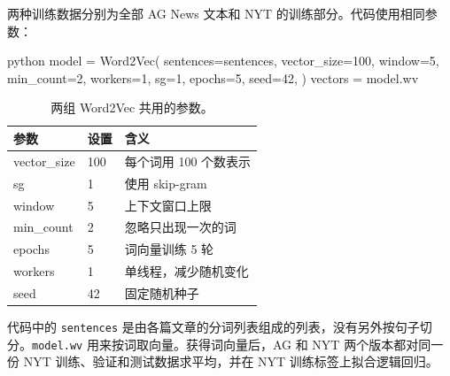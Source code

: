 \documentclass[12pt, a4paper, fontset=fandol]{ctexart}
\begin{document}
两种训练数据分别为全部 AG News 文本和 NYT 的训练部分。代码使用相同参数：
\begin{mycode}{python}
model = Word2Vec(
    sentences=sentences, vector_size=100,
    window=5, min_count=2,
    workers=1, sg=1, epochs=5, seed=42,
)
vectors = model.wv
\end{mycode}
\begin{table}[H]\centering
\begin{tabular}{llp{8cm}}\hline\hline
参数 & 设置 & 含义\\\hline
vector\_size & 100 & 每个词用 100 个数表示\\
sg & 1 & 使用 skip-gram\\
window & 5 & 上下文窗口上限\\
min\_count & 2 & 忽略只出现一次的词\\
epochs & 5 & 词向量训练 5 轮\\
workers & 1 & 单线程，减少随机变化\\
seed & 42 & 固定随机种子\\\hline\hline
\end{tabular}
\caption{两组 Word2Vec 共用的参数。}
\end{table}
代码中的 \texttt{sentences} 是由各篇文章的分词列表组成的列表，没有另外按句子切分。\texttt{model.wv} 用来按词取向量。获得词向量后，AG 和 NYT 两个版本都对同一份 NYT 训练、验证和测试数据求平均，并在 NYT 训练标签上拟合逻辑回归。
\end{document}
